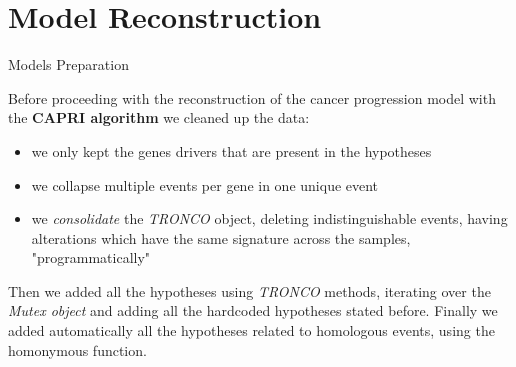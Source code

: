 \documentclass{beamer}
\begin{document}
\section{Model Reconstruction}
\begin{frame}{Models Preparation}
  \begin{block}{}
    Before proceeding with the reconstruction of the cancer progression model
    with the \textbf{CAPRI algorithm} we cleaned up the data: 
    \begin{itemize}
      \item we only kept the genes drivers that are present in the hypotheses
      \item we collapse multiple events per gene in one unique event
      \item we \textit{consolidate} the \textit{TRONCO} object, deleting
      indistinguishable events, having alterations which have the same signature
      across the samples, "programmatically" 
    \end{itemize}
  \end{block}
  \pause
  \begin{block}{}
    Then we added all the hypotheses using \textit{TRONCO} methods, iterating
    over the \textit{Mutex object} and adding all the hardcoded hypotheses
    stated before. Finally we added automatically all the hypotheses related to
    homologous events, using the homonymous function. 
  \end{block}
\end{frame}
\end{document}

